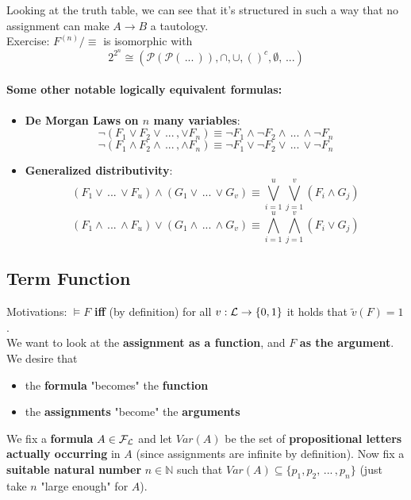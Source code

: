 \documentclass[11pt]{article}
\begin{document}
	Looking at the truth table, we can see that it's structured in such a way that no assignment can make $A \rightarrow B$ a tautology.\\
	
	Exercise: $F^{(n)}/\equiv$ is isomorphic with 
	$$2^{2^{n}} \cong (\mathcal{P} (\mathcal{P} (\, ... \, )), \cap, \cup, ()^c, \emptyset, \, ...) $$
	
	\nn \nn
	
	\paragraph{Some other notable logically equivalent formulas:}
	\begin{itemize}
		\item \textbf{De Morgan Laws on $n$ many variables}: 
		$$ \neg (F_1 \vee F_2 \vee \, ... \, , \vee F_n) \equiv \neg F_1 \wedge \neg F_2 \wedge \, ... \, \wedge \neg F_n $$
		$$ \neg (F_1 \wedge F_2 \wedge \, ... \, , \wedge F_n) \equiv \neg F_1 \vee \neg F_2 \vee \, ... \, \vee \neg F_n $$
		\item \textbf{Generalized distributivity}:
		$$ (F_1 \vee \, ... \, \vee F_u) \wedge (G_1 \vee \, ... \, \vee G_v) \equiv \bigvee_{i=1}^u \bigvee_{j = 1}^v (F_i \wedge G_j) $$
		$$ (F_1 \wedge \, ... \, \wedge F_u) \vee (G_1 \wedge \, ... \, \wedge G_v) \equiv \bigwedge_{i=1}^u \bigwedge_{j = 1}^v (F_i \vee G_j) $$
	\end{itemize}
	
	\newpage
	
	\subsection{Term Function}
	Motivations: $\models F$ \textbf{iff} (by definition) for all $v: \mathcal{L} \rightarrow \{0,1\}$ it holds that $\tilde{v}(F) = 1$.\\
	
	We want to look at the \textbf{assignment as a function}, and $F$ \textbf{as the argument}.\\
	We desire that 
	\begin{itemize}
		\item the \textbf{formula} "becomes" the \textbf{function} 
		\item the \textbf{assignments} "become" the \textbf{arguments}
	\end{itemize}
	
	We fix a \textbf{formula} $A \in \mathcal{F}_\mathcal{L}$ and let $Var(A)$ be the set of \textbf{propositional letters actually occurring} in $A$ (since assignments are infinite by definition). Now fix a \textbf{suitable natural number} $n \in \mathbb{N}$ such that $Var(A) \subseteq \{p_1, p_2, \, ... \, , p_n\}$ (just take $n$ "large enough" for $A$).\\
	
\end{document}
